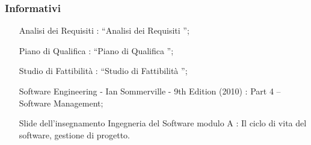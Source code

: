 		\subsubsection{Informativi}
			\begin{itemize}
				\item[Analisi dei Requisiti]: “Analisi dei Requisiti \lastversion”;
				\item[Piano di Qualifica]: “Piano di Qualifica \lastversion”;
				\item[Studio di Fattibilità]: “Studio di Fattibilità \lastversion”;
				\item[Software Engineering - Ian Sommerville - 9th Edition (2010)]: Part 4 – Software Management;
				\item[Slide dell’insegnamento Ingegneria del Software modulo A]: Il ciclo di vita del software, gestione di progetto.
			\end{itemize}
